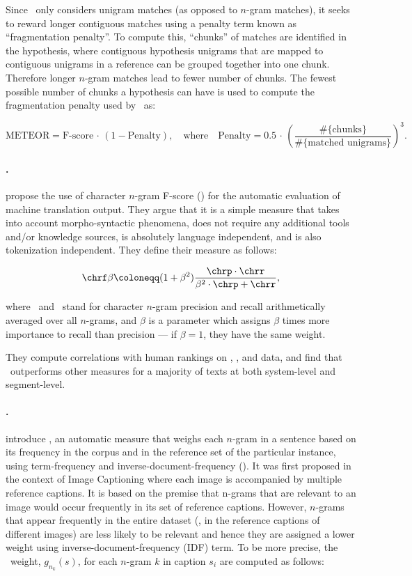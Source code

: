 Since \meteor\ only considers unigram matches (as opposed to $n$-gram matches), it seeks to reward longer contiguous matches using a penalty term known as ``fragmentation penalty''. To compute this, ``chunks'' of matches are identified in the hypothesis, where contiguous hypothesis unigrams that are mapped to contiguous unigrams in a reference can be grouped together into one chunk. Therefore longer $n$-gram matches lead to fewer number of chunks. The fewest possible number of chunks a hypothesis can have is used to compute the fragmentation penalty used by \meteor\ as:

\[ \textrm{METEOR} = \textrm{F-score} \, \cdot \, \left( 1 - \textrm{Penalty} \right) , \quad \text{where} \quad \textrm{Penalty} = 0.5 \, \cdot \, \left( \frac{\#\{\textrm{chunks}\}}{\#\{\textrm{matched unigrams}\}} \right) ^3 .\]

\paragraph{\chrf.}
\citet{popovic2015chrf} propose the use of character $n$-gram F-score (\chrf) for the automatic evaluation of machine translation output. They argue that it is a simple measure that takes into account morpho-syntactic phenomena, does not require any additional tools and/or knowledge sources, is absolutely language independent, and is also tokenization independent. They define their measure as follows:

\[ \chrf \beta \coloneqq (1 + \beta^2) \frac{\chrp \cdot \chrr}{\beta^2 \cdot \chrp + \chrr} , \]

where \chrp\ and \chrr\ stand for character $n$-gram precision and recall arithmetically averaged over all $n$-grams, and $\beta$ is a parameter which assigns $\beta$ times more importance to recall than precision --- if $\beta = 1$, they have the same weight.

They compute correlations with human rankings on , , and  data, and find that \chrf\ outperforms other measures for a majority of texts at both system-level and segment-level.

\paragraph{\cider.}
\citet{vedantam2015cider} introduce \cider, an automatic measure that weighs each $n$-gram in a sentence based on its frequency in the corpus and in the reference set of the particular instance, using term-frequency and inverse-document-frequency (\tfidf). It was first proposed in the context of Image Captioning where each image is accompanied by multiple reference captions. It is based on the premise that n-grams that are relevant to an image would occur frequently in its set of reference captions. However, $n$-grams that appear frequently in the entire dataset (\ie, in the reference captions of different images) are less likely to be relevant and hence they are assigned a lower weight using inverse-document-frequency (IDF) term. To be more precise, the \tfidf\  weight, $g_{n_k}(s)$, for each $n$-gram $k$ in caption $s_i$ are computed as follows:

